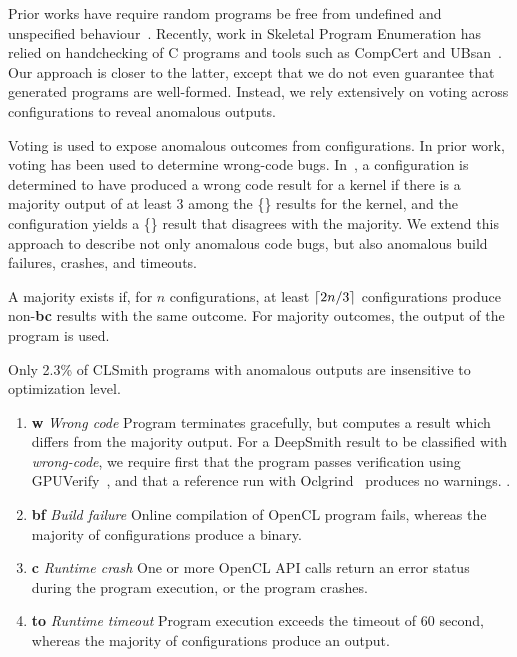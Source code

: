 Prior works have require random programs be free from undefined and unspecified behaviour~\cite{Yang2011c,Le2013a,Le2015}. Recently, work in Skeletal Program Enumeration has relied on handchecking of C programs and tools such as CompCert and UBsan~\cite{Zhang2017a}. Our approach is closer to the latter, except that we do not even guarantee that generated programs are well-formed. Instead, we rely extensively on voting across configurations to reveal anomalous outputs.

Voting is used to expose anomalous outcomes from configurations. In prior work, voting has been used to determine wrong-code bugs. In~\cite{Lidbury2015a}, a configuration is determined to have produced a wrong code result for a kernel if there is a majority output of at least 3 among the \{\cmark\} results for the kernel, and the configuration yields a \{\cmark\} result that disagrees with the majority. We extend this approach to describe not only anomalous code bugs, but also anomalous build failures, crashes, and timeouts.

A majority exists if, for $n$ configurations, at least $\lceil2n/3\rceil$ configurations produce non-\textbf{bc} results with the same outcome. For \cmark majority outcomes, the output of the program is used.

Only 2.3\% of CLSmith programs with anomalous outputs are insensitive to optimization level.

%
\begin{enumerate}
	\item \textbf{w} \emph{Wrong code} Program terminates gracefully, but computes a result which differs from the majority output. For a DeepSmith result to be classified with \emph{wrong-code}, we require first that the program passes verification using GPUVerify~\cite{Betts2012}, and that a reference run with Oclgrind~\cite{Price2015} produces no warnings. .
	\item \textbf{bf} \emph{Build failure} Online compilation of OpenCL program fails, whereas the majority of configurations produce a binary. 
	\item \textbf{c} \emph{Runtime crash} One or more OpenCL API calls return an error status during the program execution, or the program crashes.
	\item \textbf{to} \emph{Runtime timeout} Program execution exceeds the timeout of 60 second, whereas the majority of configurations produce an output.
\end{enumerate}


